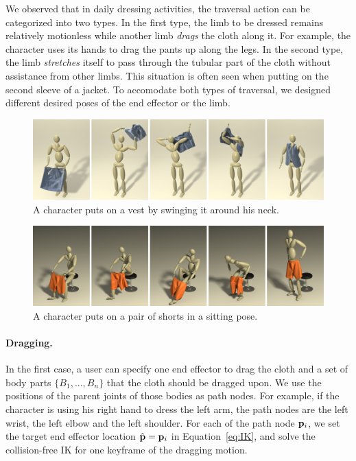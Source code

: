 We observed that in daily dressing activities, the traversal action can be categorized into two types. In the first type, the limb to be dressed remains relatively motionless  while another limb \emph{drags} the cloth along it. For example, the character uses its hands to drag the pants up along the legs. In the second type, the limb \emph{stretches} itself to pass through the tubular part of the cloth without assistance from other limbs. This situation is often seen when putting on the second sleeve of a jacket. To accomodate both types of traversal, we designed different desired poses of the end effector or the limb.


\begin{figure}[!t]
  \centering
  \includegraphics[width=\textwidth]{images/vest}
  \caption{A character puts on a vest by swinging it around his neck.}
  \label{fig:vest}
\end{figure}

\begin{figure}[!t]
  \centering
  \includegraphics[width=\textwidth]{images/shortsSitting}
  \caption{A character puts on a pair of shorts in a sitting pose.}
  \label{fig:shorts1}
\end{figure}



\paragraph{Dragging.} In the first case, a user can specify one end effector to drag the cloth and a set of body parts $\{B_1 ,..., B_n\}$ that the cloth should be dragged upon. We use the positions of the parent joints of those bodies as path nodes. For example, if the character is using his  right hand to dress the left arm, the path nodes are the left wrist, the left elbow and the left shoulder. For each of the path node $\mathbf{p}_i$, we set the target end effector location $\hat{\mathbf{p}}=\mathbf{p}_i$ in Equation~\ref{eq:IK}, and solve the collision-free IK for one keyframe of the dragging motion.  

